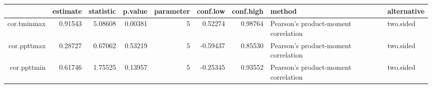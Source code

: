 \begin{table}[ht]
\centering
\begin{tabular}{rrrrrrrll}
  \hline
 & estimate & statistic & p.value & parameter & conf.low & conf.high & method & alternative \\ 
  \hline
cor.tminmax & 0.91543 & 5.08608 & 0.00381 &      5 & 0.52274 & 0.98764 & Pearson's product-moment correlation & two.sided \\ 
  cor.ppttmax & 0.28727 & 0.67062 & 0.53219 &      5 & -0.59437 & 0.85530 & Pearson's product-moment correlation & two.sided \\ 
  cor.ppttmin & 0.61746 & 1.75525 & 0.13957 &      5 & -0.25345 & 0.93552 & Pearson's product-moment correlation & two.sided \\ 
   \hline
\end{tabular}
\end{table}
